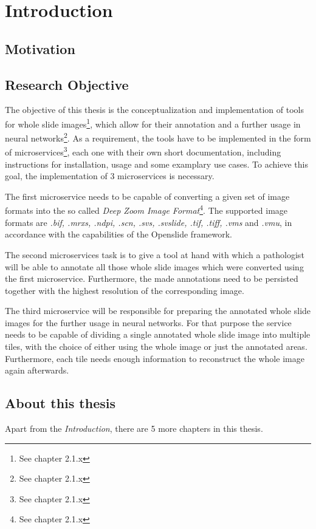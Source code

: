 \chapter{Introduction}

\section{Motivation}



\section{Research Objective}
The objective of this thesis is the conceptualization and implementation of tools for whole slide images\footnote{See chapter 2.1.x}, which allow for their annotation and a further usage in neural networks\footnote{See chapter 2.1.x}.
As a requirement, the tools have to be implemented in the form of microservices\footnote{See chapter 2.1.x}, each one with their own short documentation, including instructions for installation, usage and some examplary use cases. To achieve this goal, the implementation of 3 microservices is necessary.

The first microservice needs to be capable of converting a given set of image formats into the so called \emph{Deep Zoom Image Format}\footnote{See chapter 2.1.x}. The supported image formats are \emph{.bif, .mrxs, .ndpi, .scn, .svs, .svslide, .tif, .tiff, .vms} and \emph{.vmu}, in accordance with the capabilities of the Openslide framework\cite{Goode13}.

The second microservices task is to give a tool at hand with which a pathologist will be able to annotate all those whole slide images which were converted using the first microservice. Furthermore, the made annotations need to be persisted together with the highest resolution of the corresponding image.

The third microservice will be responsible for preparing the annotated whole slide images for the further usage in neural networks. For that purpose the service needs to be capable of dividing a single annotated whole slide image into multiple tiles, with the choice of either using the whole image or just the annotated areas. Furthermore, each tile needs enough information to reconstruct the whole image again afterwards.

\section{About this thesis}
Apart from the \emph{Introduction}, there are 5 more chapters in this thesis.

